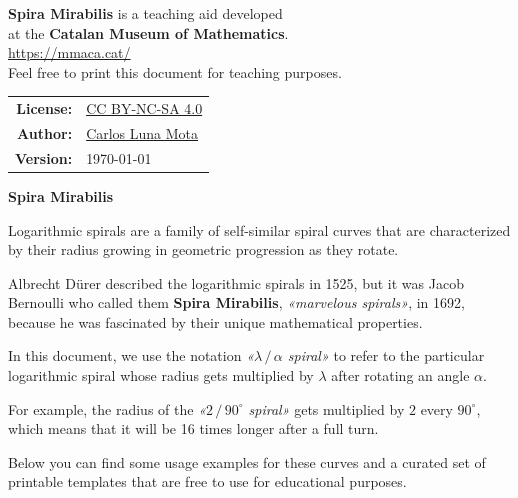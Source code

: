 \documentclass[a4paper,12pt]{article}
\begin{document}
    \phantom{.}
    \vspace{40em}

    \textbf{Spira Mirabilis} is a teaching aid developed\\at the \textbf{Catalan Museum of Mathematics}.\\\href{https://mmaca.cat/}{https://mmaca.cat/}\\[0.25ex]

    Feel free to print this document for teaching purposes.\\[1ex]

    \begin{tabular}{rl}
        \hspace{-0.6em}\textbf{License:} & \hspace{-1em} \href{https://creativecommons.org/licenses/by-nc-sa/4.0/}{CC BY-NC-SA 4.0}\\
        \hspace{-0.6em}\textbf{Author:}  & \hspace{-1em} \href{https://github.com/CarlosLunaMota}{Carlos Luna Mota}\\
        \hspace{-0.6em}\textbf{Version:} & \hspace{-1em} \today\\
    \end{tabular}

    \newpage


    \phantom{.}
    \vspace{31em}

    {\huge \bf Spira Mirabilis}

    {\large \bigskip \bigskip

    Logarithmic spirals are a family of self-similar spiral curves that are characterized by their radius growing in geometric progression as they rotate.

    Albrecht Dürer described the logarithmic spirals in 1525, but it was Jacob Bernoulli who called them \textbf{Spira Mirabilis}, \emph{«marvelous spirals»}, in 1692, because he was fascinated by their unique mathematical properties.

    In this document, we use the notation \emph{«$\lambda \, / \, \alpha$ spiral»} to refer to the particular logarithmic spiral whose radius gets multiplied by $\lambda$ after rotating an angle $\alpha$.

    For example, the radius of the \emph{«$2 \, / \, 90^{\circ}$ spiral»} gets multiplied by $2$ every $90^{\circ}$, which means that it will be 16 times longer after a full turn.

    Below you can find some usage examples for these curves and a curated set of printable templates that are free to use for educational purposes.
    }
\end{document}
